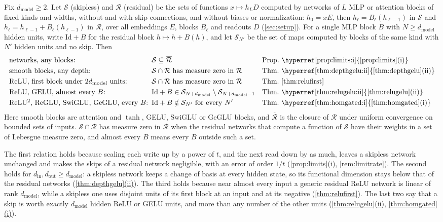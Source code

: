 \documentclass[10pt]{article}
\theoremstyle{definition}
\theoremstyle{remark}
\newcommand{\dm}{d_{\mathrm{model}}}
\DeclareRobustCommand{\cpref}[2]{\hyperref[#1:#2]{\cref*{#1}(#2)}}
\DeclareRobustCommand{\rpref}[2]{\hyperref[#1:#2]{\ref*{#1}(#2)}}
\begin{document}
Fix $\dm \ge 2$. Let $\mathcal S$ (skipless) and $\mathcal R$ (residual) be the sets of functions $x \mapsto h_LD$ computed by networks of $L$ MLP or attention blocks of fixed kinds and widths, without and with skip connections, and without biases or normalization: $h_0 = xE$, then $h_\ell = B_\ell(h_{\ell-1})$ in $\mathcal S$ and $h_\ell = h_{\ell-1} + B_\ell(h_{\ell-1})$ in $\mathcal R$, over all embeddings $E$, blocks $B_\ell$ and readouts $D$ (\cref{sec:setup}). For a single MLP block $B$ with $N \ge \dm$ hidden units, write $\mathrm{Id} + B$ for the residual block $h \mapsto h + B(h)$, and let $\mathcal S_{N'}$ be the set of maps computed by blocks of the same kind with $N'$ hidden units and no skip. Then
\[
\begin{array}{@{}l@{\enspace}l@{\quad}l@{}}
\text{networks, any blocks:} & \mathcal S \subseteq \overline{\mathcal R} & \text{Prop.~\rpref{prop:limits}{i}}\\[3pt]
\text{smooth blocks, any depth:} & \mathcal S \cap \mathcal R \text{ has measure zero in } \mathcal R & \text{Thm.~\rpref{thm:depthgelu}{ii}}\\[3pt]
\text{ReLU, first block under $2\dm$ units:} & \mathcal S \cap \mathcal R \text{ has measure zero in } \mathcal R & \text{Thm.~\ref{thm:relufirst}}\\[3pt]
\text{ReLU, GELU, almost every $B$:} & \mathrm{Id} + B \in \mathcal S_{N+\dm} \setminus \mathcal S_{N+\dm-1} & \text{Thm.~\rpref{thm:relugelu}{ii}}\\[3pt]
\text{ReLU$^2$, ReGLU, SwiGLU, GeGLU, every $B$:} & \mathrm{Id} + B \notin \mathcal S_{N'} \text{ for every } N' & \text{Thm.~\rpref{thm:homgated}{i}}
\end{array}
\]
Here smooth blocks are attention and $\tanh$, GELU, SwiGLU or GeGLU blocks, and $\overline{\mathcal R}$ is the closure of $\mathcal R$ under uniform convergence on bounded sets of inputs. $\mathcal S \cap \mathcal R$ has measure zero in $\mathcal R$ when the residual networks that compute a function of $\mathcal S$ have their weights in a set of Lebesgue measure zero, and almost every $B$ means every $B$ outside such a set.

The first relation holds because scaling each write up by a power of $t$, and the next read down by as much, leaves a skipless network unchanged and makes the skips of a residual network negligible, with an error of order $1/t$ (\cpref{prop:limits}{i}, \cref{rem:limitrate}). The second holds for $d_{\mathrm{in}}, d_{\mathrm{out}} \ge \dm$: a skipless network keeps a change of basis at every hidden state, so its functional dimension stays below that of the residual networks (\cpref{thm:depthgelu}{ii}). The third holds because near almost every input a generic residual ReLU network is linear of rank $\dm$, while a skipless one uses disjoint units of its first block at an input and at its negative (\cref{thm:relufirst}). The last two say that a skip is worth exactly $\dm$ hidden ReLU or GELU units, and more than any number of the other units (\cpref{thm:relugelu}{ii}, \cpref{thm:homgated}{i}).
\end{document}
